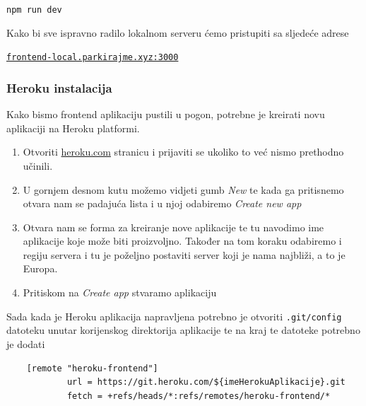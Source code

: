 								\begin{center}
										\texttt{npm run dev}
								\end{center}
								
								Kako bi sve ispravno radilo lokalnom serveru ćemo pristupiti sa sljedeće adrese

								\begin{center}
										\href{http://frontend-local.parkirajme.xyz:3000/}{\texttt{frontend-local.parkirajme.xyz:3000}}
								\end{center}
		             
						\pagebreak
		    
						\subsubsection*{Heroku instalacija}
	        
								Kako bismo frontend aplikaciju pustili u pogon, potrebne je kreirati novu aplikaciji na Heroku platformi.
								
								\begin{enumerate}
									\item Otvoriti \href{https://dashboard.heroku.com/apps}{heroku.com} stranicu i prijaviti se ukoliko to već nismo prethodno učinili.
									\item U gornjem desnom kutu možemo vidjeti gumb \textit{New} te kada ga pritisnemo otvara nam se padajuća lista i u njoj odabiremo \textit{Create new app}
									\item Otvara nam se forma za kreiranje nove aplikacije te tu navodimo ime aplikacije koje može biti proizvoljno. Također na tom koraku odabiremo i regiju servera i tu je poželjno postaviti server koji je nama najbliži, a to je Europa.
									\item Pritiskom na \textit{Create app} stvaramo aplikaciju
		        		\end{enumerate}
		        
		        		Sada kada je Heroku aplikacija napravljena potrebno je otvoriti \texttt{.git/config} datoteku unutar korijenskog direktorija aplikacije te na kraj te datoteke potrebno je dodati

                \begin{verbatim}
    [remote "heroku-frontend"]
        	url = https://git.heroku.com/${imeHerokuAplikacije}.git
        	fetch = +refs/heads/*:refs/remotes/heroku-frontend/*
								\end{verbatim}
								

